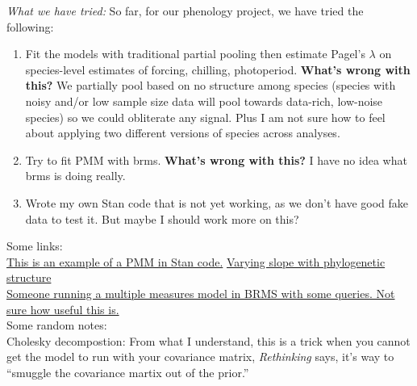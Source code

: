 \documentclass[11pt,letter]{article}
\begin{document}
\emph{What we have tried:} So far, for our phenology project, we have tried the following:
\begin{enumerate}
\item Fit the models with traditional partial pooling then estimate Pagel's $\lambda$ on species-level estimates of forcing, chilling, photoperiod. {\bf What's wrong with this?} We partially pool based on no structure among species (species with noisy and/or low sample size data will pool towards data-rich, low-noise species) so we could obliterate any signal. Plus I am not sure how to feel about applying two different versions of species across analyses.
\item Try to fit PMM with brms. {\bf What's wrong with this?} I have no idea what brms is doing really.
\item Wrote my own Stan code that is not yet working, as we don't have good fake data to test it. But maybe I should work more on this?
\end{enumerate}


\clearpage
Some links:\\
\href{https://groups.google.com/forum/#!topic/stan-users/Irv9RWDCpQE}{This is an example of a PMM in Stan code.}
\href{https://discourse.mc-stan.org/t/varying-slope-with-phylogenetic-structure/5739/4}{Varying slope with phylogenetic structure}\\
\href{https://discourse.mc-stan.org/t/multivariate-phylogenetic-with-repeated-measurements-model-help/14359/6}{Someone running a multiple measures model in BRMS with some queries. Not sure how useful this is.}\\

Some random notes:\\
Cholesky decompostion: From what I understand, this is a trick when you cannot get the model to run with your covariance matrix, \emph{Rethinking} says, it's way to ``smuggle the covariance martix out of the prior.''
\end{document}
